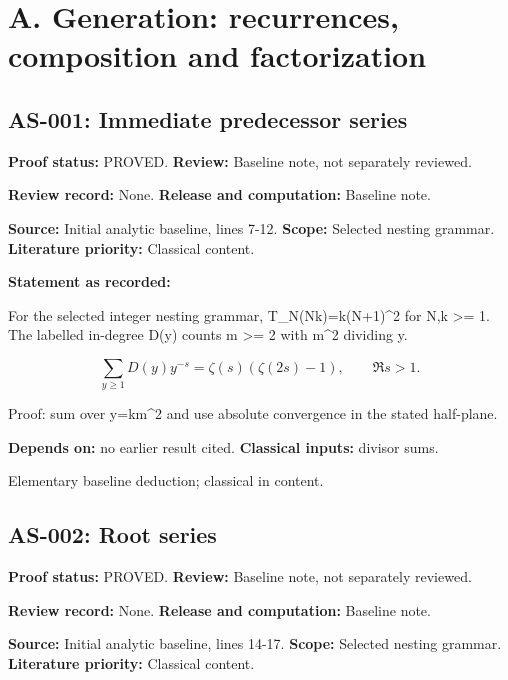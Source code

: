 \documentclass[
  11pt,
]{article}
\begin{document}
\hypertarget{a.-generation-recurrences-composition-and-factorization}{%
\section{A. Generation: recurrences, composition and
factorization}\label{a.-generation-recurrences-composition-and-factorization}}

\hypertarget{as-001-immediate-predecessor-series}{%
\subsection{AS-001: Immediate predecessor
series}\label{as-001-immediate-predecessor-series}}

\textbf{Proof status:} PROVED. \textbf{Review:} Baseline note, not
separately reviewed.

\textbf{Review record:} None. \textbf{Release and computation:} Baseline
note.

\textbf{Source:} Initial analytic baseline, lines 7-12. \textbf{Scope:}
Selected nesting grammar. \textbf{Literature priority:} Classical
content.

\textbf{Statement as recorded:}

For the selected integer nesting grammar, T\_N(Nk)=k(N+1)\^{}2 for N,k
\textgreater= 1. The labelled in-degree D(y) counts m \textgreater= 2
with m\^{}2 dividing y.

\[\sum_{y\ge1}D(y)y^{-s}=\zeta(s)(\zeta(2s)-1),\qquad \Re s>1.\]

Proof: sum over y=km\^{}2 and use absolute convergence in the stated
half-plane.

\textbf{Depends on:} no earlier result cited. \textbf{Classical inputs:}
divisor sums.

Elementary baseline deduction; classical in content.

\hypertarget{as-002-root-series}{%
\subsection{AS-002: Root series}\label{as-002-root-series}}

\textbf{Proof status:} PROVED. \textbf{Review:} Baseline note, not
separately reviewed.

\textbf{Review record:} None. \textbf{Release and computation:} Baseline
note.

\textbf{Source:} Initial analytic baseline, lines 14-17. \textbf{Scope:}
Selected nesting grammar. \textbf{Literature priority:} Classical
content.
\end{document}
